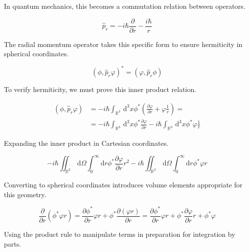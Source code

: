 \documentclass[italian]{HKNdocument}
\begin{document}
In quantum mechanics, this becomes a commutation relation between operators.

\begin{equation}
\hat{p}_{r}=-i \hbar \frac{\partial}{\partial r}-\frac{i \hbar}{r} \label{eq:9.16}
\end{equation}

The radial momentum operator takes this specific form to ensure hermiticity in spherical coordinates.

\begin{equation}
\left(\phi, \hat{p}_{r} \varphi\right)^{*}=\left(\varphi, \hat{p}_{r} \phi\right) \label{eq:9.17}
\end{equation}

To verify hermiticity, we must prove this inner product relation.

\begin{align}
\left(\phi, \hat{p}_{r} \varphi\right) & =-i \hbar \int_{\mathbb{R}^{3}} \, \mathrm{d}^{3} x \phi^{*}\left(\frac{\partial \varphi}{\partial r}+\varphi \frac{1}{r}\right)=  \label{eq:9.18}\\
& =-i \hbar \int_{\mathbb{R}^{3}} \, \mathrm{d}^{3} x \phi^{*} \frac{\partial \varphi}{\partial r}-i \hbar \int_{\mathbb{R}^{3}} \, \mathrm{d}^{3} x \phi^{*} \varphi \frac{1}{r}
\end{align}

Expanding the inner product in Cartesian coordinates.

\begin{equation}
-i \hbar \iint_{\mathbb{R}^{2}} \, \mathrm{d} \Omega \int_{0}^{\infty} \mathrm{d} r \phi^{*} \frac{\partial \varphi}{\partial r} r^{2}-i \hbar \iint_{\mathbb{R}^{2}} \, \mathrm{d} \Omega \int_{0}^{\infty} \mathrm{d} r \phi^{*} \varphi r \label{eq:9.19}
\end{equation}

Converting to spherical coordinates introduces volume elements appropriate for this geometry.

\begin{equation}
\frac{\partial}{\partial r}\left(\phi^{*} \varphi r\right)=\frac{\partial \phi^{*}}{\partial r} \varphi r+\phi^{*} \frac{\partial(\varphi r)}{\partial r}=\frac{\partial \phi^{*}}{\partial r} \varphi r+\phi^{*} \frac{\partial \varphi}{\partial r} r+\phi^{*} \varphi \label{eq:9.20}
\end{equation}

Using the product rule to manipulate terms in preparation for integration by parts.
\end{document}
